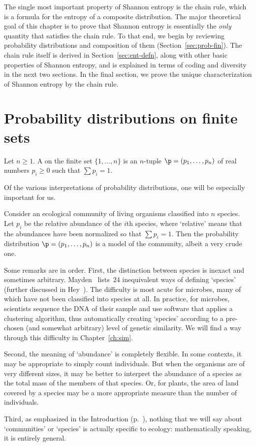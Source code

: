 The single most important property of Shannon entropy is the chain rule,
which is a formula for the entropy of a composite distribution.  The major
theoretical goal of this chapter is to prove that Shannon entropy is
essentially the \emph{only} quantity that satisfies the chain rule.  To
that end, we begin by reviewing probability distributions and composition
of them (Section~\ref{sec:prob-fin}).  The chain rule itself is derived in
Section~\ref{sec:ent-defn}, along with other basic properties of Shannon
entropy, and is explained in terms of coding and diversity in the next
two sections.  In the final section, we prove the unique characterization
of Shannon entropy by the chain rule.


\section{Probability distributions on finite sets}


Let $n \geq 1$.  A %
%
% 
on the finite set $\{1, \ldots, n\}$ is an $n$-tuple $\p = (p_1, \ldots,
p_n)$ of real numbers $p_i \geq 0$ such that $\sum p_i = 1$.

Of the various interpretations of probability distributions, one will be
especially important for us.

\begin{example}
Consider an ecological community of living organisms
classified into $n$ 
species.  Let $p_i$ be the relative abundance of
the $i$th species, where 
`relative' 
means that the abundances have been normalized so that $\sum p_i
= 1$.  Then the probability distribution $\p = (p_1, \ldots, p_n)$ is a
model of the community, albeit a very crude one.

Some remarks are in order.  First, the distinction between
species is 
inexact and sometimes arbitrary.  Mayden~\cite{Mayd} lists~24 inequivalent
ways of defining `species' (further discussed in Hey~\cite{Hey}).  The
difficulty is most acute for microbes, many of which have not been
classified into species at all.  In practice, for microbes, scientists
sequence the DNA of their sample and use software that applies a clustering
algorithm, thus automatically creating `species' according to a pre-chosen
(and somewhat arbitrary) level of genetic similarity.  We will find a way
through this difficulty in Chapter~\ref{ch:sim}.

Second, the meaning of `abundance'%
%
% 
is completely flexible.  In some contexts, it may be appropriate to simply
count individuals.  But when the organisms are of very different sizes, it
may be better to interpret the abundance of a species as the total mass of
the members of that species.  Or, for plants, the area of land covered by a
species may be a more appropriate measure than the number of individuals.

Third, as emphasized in the Introduction (p.~\pageref{p:general}), nothing
that we will say about `communities' or `species' is actually specific to
ecology: mathematically speaking, it is entirely general.
\end{example}

